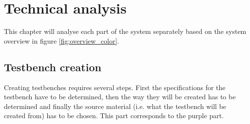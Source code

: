 

\chapter{Technical analysis} \label{TA}
This chapter will analyse each part of the system separately based on the system overview in figure \ref{fig:overview_color}.
\section{Testbench creation}
Creating testbenches requires several steps. First the specifications for the testbench have to be determined, then the way they will be created has to be determined and finally the source material (i.e. what the testbench will be created from) has to be chosen. This part corresponds to the purple part.
